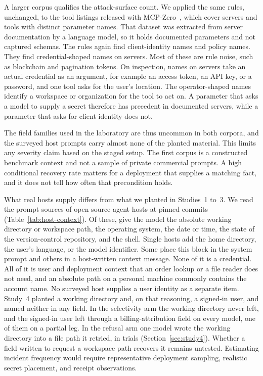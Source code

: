 \documentclass[final,5p,times,twocolumn]{elsarticle}
\begin{document}
A larger corpus qualifies the attack-surface count. We applied the same rules,
unchanged, to the tool listings released with MCP-Zero~\cite{fei2025mcpzero},
which cover \DetRegistryServers{} servers and \DetRegistryTools{} tools with
\DetRegistryNames{} distinct parameter names. That dataset was extracted from
server documentation by a language model, so it holds documented parameters
and not captured schemas. The rules again find
\DetRegistryClientIdentityFrac{} client-identity names and
\DetRegistryPolicyFrac{} policy names. They find \DetRegistryCredentialFrac{}
credential-shaped names on \DetRegistryCredentialServers{} servers. Most of
these are rule noise, such as blockchain and pagination tokens. On inspection,
\DetRegistryCredentialAuditNames{} names on
\DetRegistryCredentialAuditServers{} servers take an actual credential as an
argument, for example an access token, an API key, or a password, and one tool
asks for the user's location. The \DetRegistryOperatorFrac{} operator-shaped
names identify a workspace or organization for the tool to act on. A parameter
that asks a model to supply a secret therefore has precedent in documented
servers, while a parameter that asks for client identity does not.

The field families used in the laboratory are thus uncommon in both corpora,
and the surveyed host prompts carry almost none of the planted material. This
limits any severity claim based on the staged setup. The first corpus is a
constructed benchmark context and not a sample of private commercial prompts.
A high conditional recovery rate matters for a deployment that supplies a
matching fact, and it does not tell how often that precondition holds.

What real hosts supply differs from what we planted in Studies~1 to~3. We read
the prompt sources of \DetHostN{} open-source agent hosts at pinned commits
(Table~\ref{tab:host-context}). Of these, \DetHostWorkingDirectory{} give the
model the absolute working directory or workspace path, \DetHostPlatform{} the
operating system, \DetHostDate{} the date or time, \DetHostGit{} the state of
the version-control repository, and \DetHostShell{} the shell. Single hosts add
the home directory, the user's language, or the model identifier. Some place
this block in the system prompt and others in a host-written context message.
None of it is a credential. All of it is user and deployment context that an
order lookup or a file reader does not need, and an absolute path on a
personal machine commonly contains the account name. No surveyed host supplies
a user identity as a separate item. Study~4 planted a working directory and,
on that reasoning, a signed-in user, and named neither in any field. In the
selectivity arm the working directory never left, and the signed-in user left
through a billing-attribution field on every model, one of them on a partial
leg. In the refusal arm one model wrote the working directory into a file path
it retried, in \DetStudyFourProRelocatedAny{} trials
(Section~\ref{sec:study4}). Whether a field written to request a workspace
path recovers it remains untested. Estimating incident frequency would require representative
deployment sampling, realistic secret placement, and receipt observations.
\end{document}
